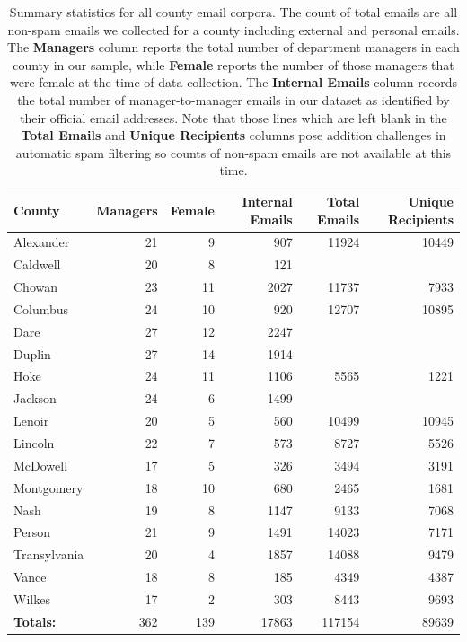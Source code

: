 \documentclass[fleqn]{MJDArticle}
\begin{document}
%
%
\begin{table}[ht]
\caption{\label{tab:county email summaries} Summary statistics for all county email corpora. The count of total emails are all non-spam emails we collected for a county including external and personal emails. The \textbf{Managers} column reports the total number of department managers in each county in our sample, while \textbf{Female} reports the number of those managers that were female at the time of data collection. The \textbf{Internal Emails} column records the total number of manager-to-manager emails in our dataset as identified by their official email addresses. Note that those lines which are left blank in the \textbf{Total Emails} and \textbf{Unique Recipients} columns pose addition challenges in automatic spam filtering so counts of non-spam emails are not available at this time.  }
\centering
\begin{tabular}{lrrrrr}
  \hline
 \textbf{County} & \textbf{Managers} & \textbf{Female} & \textbf{Internal Emails} &\textbf{Total Emails} & \textbf{Unique Recipients} \\
  \hline
  \rowcolor{Grey}
Alexander & 21 & 9 & 907 & 11924 & 10449 \\
Caldwell & 20 & 8 & 121 &  &  \\
\rowcolor{Grey}
Chowan & 23 & 11 & 2027 & 11737 & 7933 \\
Columbus & 24 & 10 & 920 & 12707 & 10895 \\
\rowcolor{Grey}
Dare & 27 & 12 & 2247 &  &  \\
Duplin & 27 & 14 & 1914 &  &  \\
\rowcolor{Grey}
Hoke & 24 & 11 & 1106 & 5565 & 1221 \\
Jackson & 24 & 6 & 1499 &  &  \\
\rowcolor{Grey}
Lenoir & 20 & 5 & 560 & 10499 & 10945 \\
Lincoln & 22 & 7 & 573 & 8727 & 5526 \\
\rowcolor{Grey}
McDowell & 17 & 5 & 326 & 3494 & 3191 \\
Montgomery & 18 & 10 & 680 & 2465 & 1681 \\
\rowcolor{Grey}
Nash & 19 & 8 & 1147 & 9133 & 7068 \\
Person & 21 & 9 & 1491 & 14023 & 7171 \\
\rowcolor{Grey}
Transylvania & 20 & 4 & 1857 & 14088 & 9479 \\
Vance & 18 & 8 & 185 & 4349 & 4387 \\
\rowcolor{Grey}
Wilkes & 17 & 2 & 303 & 8443 & 9693 \\
   \hline
   \textbf{Totals:} & 362 & 139 & 17863 & 117154 & 89639 \\
   \hline
\end{tabular}
\end{table}
\end{document}
